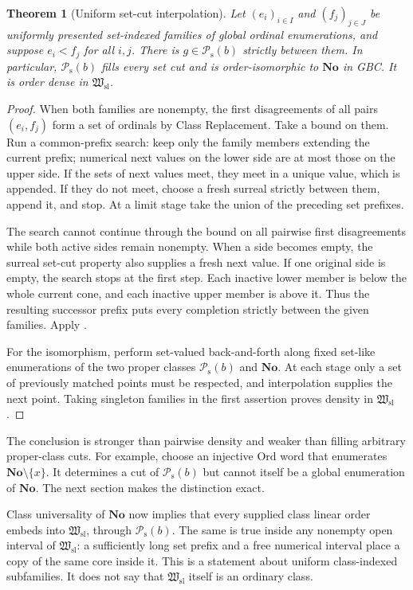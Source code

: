 \documentclass[11pt]{article}
\newtheorem{theorem}{Theorem}[section]
\theoremstyle{definition}
\theoremstyle{remark}
\newcommand{\No}{\mathbf{No}}
\newcommand{\Ord}{\mathrm{Ord}}
\newcommand{\Hsl}{\mathfrak W_{\mathrm{sl}}}
\newcommand{\Psupp}{\mathcal P_{\mathrm{s}}}
\begin{document}
\begin{theorem}[Uniform set-cut interpolation]
\label{swo:sh:thm:global-interpolation}
Let $(e_i)_{i\in I}$ and $(f_j)_{j\in J}$ be uniformly presented
set-indexed families of global ordinal enumerations, and suppose
$e_i<f_j$ for all $i,j$. There is $g\in \Psupp(b)$ strictly between them.
In particular, $\Psupp(b)$ fills every set cut and is order-isomorphic
to $\No$ in GBC. It is order dense in $\Hsl$.
\end{theorem}
\begin{proof}
When both families are nonempty, the first disagreements of all pairs
$(e_i,f_j)$ form a set of ordinals by Class Replacement. Take a bound
on them. Run a common-prefix search: keep only the family members
extending the current prefix; numerical next values on the lower side
are at most those on the upper side. If the sets of next values meet,
they meet in a unique value, which is appended. If they do not meet,
choose a fresh surreal strictly between them, append it, and stop.
At a limit stage take the union of the preceding set prefixes.

The search cannot continue through the bound on all pairwise first
disagreements while both active sides remain nonempty. When a side
becomes empty, the surreal set-cut property also supplies a fresh
next value. If one original side is empty, the search stops at the
first step. Each inactive lower member is below the whole current
cone, and each inactive upper member is above it. Thus the resulting
successor prefix puts every completion strictly between the given
families. Apply .

For the isomorphism, perform set-valued back-and-forth along fixed
set-like enumerations of the two proper classes $\Psupp(b)$ and $\No$.
At each stage only a set of previously matched points must be respected,
and interpolation supplies the next point. Taking singleton families
in the first assertion proves density in $\Hsl$.
\end{proof}

The conclusion is stronger than pairwise density and weaker than
filling arbitrary proper-class cuts. For example, choose an injective
$\Ord$ word that enumerates $\No\setminus\{x\}$. It determines a
cut of $\Psupp(b)$ but cannot itself be a global enumeration of $\No$.
The next section makes the distinction exact.

Class universality of $\No$ now implies that every supplied class
linear order embeds into $\Hsl$, through $\Psupp(b)$. The same is true
inside any nonempty open interval of $\Hsl$: a sufficiently long
set prefix and a free numerical interval place a copy of the same
core inside it. This is a statement about uniform class-indexed
subfamilies. It does not say that $\Hsl$ itself is an ordinary class.
\end{document}
